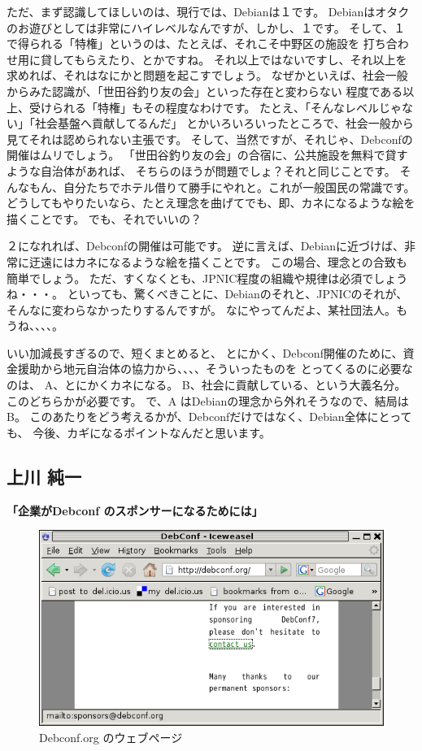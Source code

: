 \documentclass[mingoth,a4paper]{jsarticle}
\begin{document}
ただ、まず認識してほしいのは、現行では、Debianは１です。
Debianはオタクのお遊びとしては非常にハイレベルなんですが、しかし、１です。
そして、１で得られる「特権」というのは、たとえば、それこそ中野区の施設を
打ち合わせ用に貸してもらえたり、とかですね。
それ以上ではないですし、それ以上を求めれば、それはなにかと問題を起こすでしょう。
なぜかといえば、社会一般からみた認識が、「世田谷釣り友の会」といった存在と変わらない
程度である以上、受けられる「特権」もその程度なわけです。
たとえ、「そんなレベルじゃない」「社会基盤へ貢献してるんだ」
とかいろいろいったところで、社会一般から見てそれは認められない主張です。
そして、当然ですが、それじゃ、Debconfの開催はムリでしょう。
「世田谷釣り友の会」の合宿に、公共施設を無料で貸すような自治体があれば、
そちらのほうが問題でしょ？それと同じことです。
そんなもん、自分たちでホテル借りて勝手にやれと。これが一般国民の常識です。
どうしてもやりたいなら、たとえ理念を曲げてでも、即、カネになるような絵を描くことです。
でも、それでいいの？

２になれれば、Debconfの開催は可能です。
逆に言えば、Debianに近づけば、非常に迂遠にはカネになるような絵を描くことです。
この場合、理念との合致も簡単でしょう。
ただ、すくなくとも、JPNIC程度の組織や規律は必須でしょうね・・・。
といっても、驚くべきことに、Debianのそれと、JPNICのそれが、そんなに変わらなかったりするんですが。
なにやってんだよ、某社団法人。もうね、、、、。

いい加減長すぎるので、短くまとめると、
とにかく、Debconf開催のために、資金援助から地元自治体の協力から、、、、そういったものを
とってくるのに必要なのは、
A、とにかくカネになる。
B、社会に貢献している、という大義名分。
このどちらかが必要です。
で、A はDebianの理念から外れそうなので、結局はB。
このあたりをどう考えるかが、Debconfだけではなく、Debian全体にとっても、
今後、カギになるポイントなんだと思います。

\subsection{上川 純一}

\textbf{「企業がDebconf のスポンサーになるためには」}

\begin{figure}[H]
\begin{center}
  \includegraphics[width=1\hsize]{image200707/debconf-sponsor.png}
\end{center}
\caption{Debconf.org のウェブページ}
\end{figure}
\end{document}
